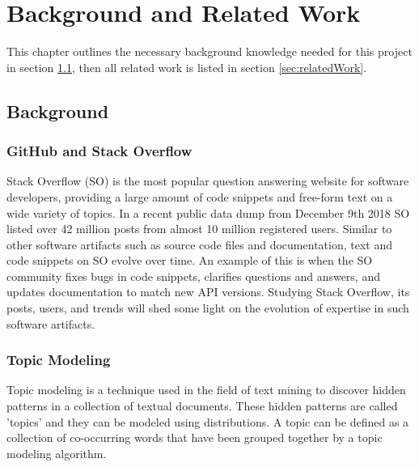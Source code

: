 \chapter{Background and Related Work\label{chap:relatedWork}}
    This chapter outlines the necessary background knowledge needed for this project in section \ref{sec:background}, then all related work is listed in section \ref{sec:relatedWork}.
    
\section{Background} \label{sec:background}
    
    \subsection{GitHub and Stack Overflow}
    
        Stack Overflow (SO) is the most popular question answering website for software developers, providing a large amount of code snippets and free-form text on a wide variety of topics. In a recent public data dump from December 9th 2018 SO listed over 42 million posts from almost 10 million registered users. Similar to other software artifacts such as source code files and documentation, text and code snippets on SO evolve over time. An example of this is when the SO community fixes bugs in code snippets, clarifies questions and answers, and updates documentation to match new API versions. Studying Stack Overflow, its posts, users, and trends will shed some light on the evolution of expertise in such software artifacts.
    
    \subsection{Topic Modeling}
        
        Topic modeling is a technique used in the field of text mining to discover hidden patterns in a collection of textual documents. These hidden patterns are called 'topics' and they can be modeled using distributions. A topic can be defined as a collection of co-occurring words that have been grouped together by a topic modeling algorithm.
        
